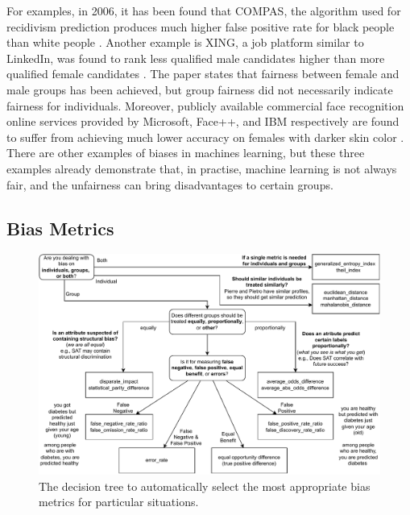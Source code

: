 \documentclass[sigconf,review]{acmart}
\begin{document}
For examples, in 2006, it has been found that COMPAS, the algorithm used for recidivism prediction produces much higher false positive rate for black people than white people \cite{angwin2016machine}. Another example is XING, a job platform similar to LinkedIn, was found to rank less qualified male candidates higher than more qualified female candidates \cite{lahoti2019ifair}. The paper states that fairness between female and male groups has been achieved, but group fairness did not necessarily indicate fairness for individuals. Moreover, publicly available commercial face recognition online services provided by Microsoft, Face++, and IBM respectively are found to suffer from achieving much lower accuracy on females with darker skin color \cite{buolamwini2018gender}. There are other examples of biases in machines learning, but these three examples already demonstrate that, in practise, machine learning is not always fair, and the unfairness can bring disadvantages to certain groups. 


\subsection{Bias Metrics}
\label{sec:bias_metrics}

\begin{figure}[h]
	\includegraphics[width=\linewidth]{figures/wizard-metric}
	\caption{The decision tree to automatically select the most appropriate bias metrics for particular situations.}
	\label{fig:wizard-metric}
\end{figure}
\end{document}
